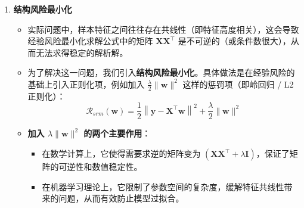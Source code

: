 \documentclass{article}
\theoremstyle{remark}
\theoremstyle{definition}
\theoremstyle{plain}
\numberwithin {equation}{section}
\numberwithin{assumption}{section}
\begin{document}
\begin{enumerate}
\begin{itemize}
\begin{itemize}
            \item \textbf{链式法则}：
            设 $\boldsymbol{x} \in \mathbb{R}^M, \boldsymbol{y}=g(\boldsymbol{x}) \in \mathbb{R}^K, \boldsymbol{z}=f(\boldsymbol{y}) \in \mathbb{R}^N$。根据多元微积分的求导法则，有 $\frac{\partial z_j}{\partial x_i} = \sum_{k} \frac{\partial y_k}{\partial x_i} \frac{\partial z_j}{\partial y_k} = \sum_{k} \left(\frac{\partial \boldsymbol{y}}{\partial \boldsymbol{x}}\right)_{ik} \left(\frac{\partial \boldsymbol{z}}{\partial \boldsymbol{y}}\right)_{kj}$。结合矩阵乘法的定义，这恰好是两个导数矩阵的乘积：
            \begin{align*}
            \frac{\partial \boldsymbol{z}}{\partial \boldsymbol{x}}=\frac{\partial \boldsymbol{y}}{\partial \boldsymbol{x}} \frac{\partial \boldsymbol{z}}{\partial \boldsymbol{y}} \quad \in \mathbb{R}^{M \times N} 
            \end{align*}
        \end{itemize}
        利用矩阵微积分对 $\mathcal{R}(\boldsymbol{w})$ 关于 $\boldsymbol{w}$ 求导并令导数为零，我们即可得到经验风险最小化下最优参数的解析表达式：
        \begin{equation*}
        \boldsymbol{w}^*=\left(\boldsymbol{X} \boldsymbol{X}^{\top}\right)^{-1} \boldsymbol{X} \boldsymbol{y}
        \end{equation*}
    \end{itemize}

    \item \textbf{结构风险最小化}
    \begin{itemize}
        \item 实际问题中，样本特征之间往往存在共线性（即特征高度相关），这会导致经验风险最小化求解公式中的矩阵 $\boldsymbol{X} \boldsymbol{X}^{\top}$ 是不可逆的（或条件数很大），从而无法求得稳定的解析解。
        
        \item 为了解决这一问题，我们引入\textbf{结构风险最小化}。具体做法是在经验风险的基础上引入正则化项，例如加入 $\frac{\lambda}{2}\|\boldsymbol{w}\|^2$ 这样的惩罚项（即岭回归 / L2 正则化）：
        \begin{equation*}
        \mathcal{R}_{srm}(\boldsymbol{w}) = \frac{1}{2}\left\|\boldsymbol{y}-\boldsymbol{X}^{\top} \boldsymbol{w}\right\|^2 + \frac{\lambda}{2}\|\boldsymbol{w}\|^2
        \end{equation*}
        
        \item \textbf{加入 $\lambda\|\boldsymbol{w}\|^2$ 的两个主要作用}：
        \begin{itemize}
            \item 在数学计算上，它使得需要求逆的矩阵变为 $(\boldsymbol{X}\boldsymbol{X}^{\top} + \lambda \boldsymbol{I})$，保证了矩阵的可逆性和数值稳定性。
            \item 在机器学习理论上，它限制了参数空间的复杂度，缓解特征共线性带来的问题，从而有效防止模型过拟合。
        \end{itemize}
    \end{itemize}
\end{enumerate}
\end{document}
